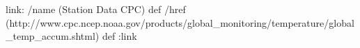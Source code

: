 
\begin{ingrid}
link:
/name (Station Data CPC) def
/href (http://www.cpc.ncep.noaa.gov/products/global_monitoring/temperature/global_temp_accum.shtml) def
:link

\end{ingrid}
